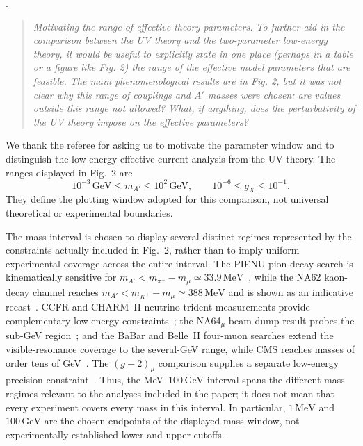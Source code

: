 \documentclass[12pt,a4paper]{article}
\begin{document}
\medskip
{}. \begin{quote}\itshape
Motivating the range of effective theory parameters. To further aid in the comparison between the UV theory and the two-parameter low-energy theory, it would be useful to explicitly state in one place (perhaps in a table or a figure like Fig. 2) the range of the effective model parameters that are feasible. The main phenomenological results are in Fig. 2, but it was not clear why this range of couplings and \(A'\) masses were chosen: are values outside this range not allowed? What, if anything, does the perturbativity of the UV theory impose on the effective parameters?\end{quote}

We thank the referee for asking us to motivate the parameter window and to distinguish the low-energy effective-current analysis from the UV theory. The ranges displayed in Fig.~2 are
\[
10^{-3}\,\mathrm{GeV}\leq m_{A'}\leq10^2\,\mathrm{GeV},
\qquad
10^{-6}\leq g_X\leq10^{-1}.
\]
They define the plotting window adopted for this comparison, not universal theoretical or experimental boundaries.

The mass interval is chosen to display several distinct regimes represented by the constraints actually included in Fig.~2, rather than to imply uniform experimental coverage across the entire interval. The PIENU pion-decay search is kinematically sensitive for \(m_{A'}<m_{\pi^+}-m_\mu\simeq33.9\,\mathrm{MeV}\)~\cite{PIENU:2021clt,Altmannshofer:2026opc}, while the NA62 kaon-decay channel reaches \(m_{A'}<m_{K^+}-m_\mu\simeq388\,\mathrm{MeV}\) and is shown as an indicative recast~\cite{NA62:2021bji}. CCFR and CHARM~II neutrino-trident measurements provide complementary low-energy constraints~\cite{CCFR:1991lpl,geiregat1990first}; the NA64\(_\mu\) beam-dump result probes the sub-GeV region~\cite{NA64:2024nwj}; and the BaBar and Belle~II four-muon searches extend the visible-resonance coverage to the several-GeV range, while CMS reaches masses of order tens of GeV~\cite{BaBar:2016sci,Belle-II:2024wtd,CMS:2018yxg}. The \((g-2)_\mu\) comparison supplies a separate low-energy precision constraint~\cite{Muong-2:2025xyk}. Thus, the MeV--\(100\,\mathrm{GeV}\) interval spans the different mass regimes relevant to the analyses included in the paper; it does not mean that every experiment covers every mass in this interval. In particular, \(1\,\mathrm{MeV}\) and \(100\,\mathrm{GeV}\) are the chosen endpoints of the displayed mass window, not experimentally established lower and upper cutoffs.
\end{document}
